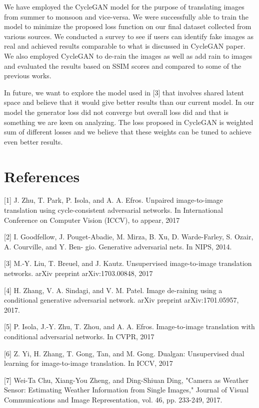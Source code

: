 \documentclass{article}
\begin{document}
We have employed the CycleGAN model for the purpose of translating images from summer to monsoon and vice-versa. We were successfully able to train the model to minimize the proposed loss function on our final dataset collected from various sources. We conducted a survey to see if users can identify fake images as real and achieved results comparable to what is discussed in CycleGAN paper. We also employed CycleGAN to de-rain the images as well as add rain to images and evaluated the results based on SSIM scores and compared to some of the previous works.

In future, we want to explore the model used in [3] that involves shared latent space and believe that it would give better results than our current model. In our model the generator loss did not converge but overall loss did and that is something we are keen on analyzing. The loss proposed in CycleGAN is weighted sum of different losses and we believe that these weights can be tuned to achieve even better results.

\section*{References}

\small
\label{[1]}[1] J. Zhu, T. Park, P. Isola, and A. A. Efros. Unpaired image-to-image 
translation using cycle-consistent adversarial networks. 
In International Conference on Computer Vision (ICCV), to appear, 2017

\label{[2]}[2] I. Goodfellow, J. Pouget-Abadie, M. Mirza, B. Xu, D. Warde-Farley, 
S. Ozair, A. Courville, and Y. Ben- gio. Generative adversarial nets. 
In NIPS, 2014.

\label{[3]}[3] M.-Y. Liu, T. Breuel, and J. Kautz. Unsupervised 
image-to-image translation networks. arXiv preprint arXiv:1703.00848, 2017

\label{[4]}[4] H. Zhang, V. A. Sindagi, and V. M. Patel. Image de-raining using a conditional generative 
adversarial network. arXiv preprint arXiv:1701.05957, 2017.

\label{[5]}[5] P. Isola, J.-Y. Zhu, T. Zhou, and A. A. Efros. 
Image-to-image translation with conditional adversarial networks. 
In CVPR, 2017

\label{[6]}[6] Z. Yi, H. Zhang, T. Gong, Tan, and M. Gong. Dualgan: 
Unsupervised dual learning for image-to-image translation. 
In ICCV, 2017

\label{[7]}[7] Wei-Ta Chu, Xiang-You Zheng, and Ding-Shiuan Ding, "Camera as Weather Sensor: Estimating Weather Information from Single Images," Journal of Visual Communications and Image Representation, vol. 46, pp. 233-249, 2017.
\end{document}

